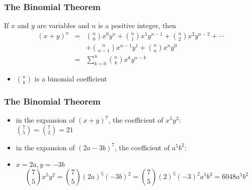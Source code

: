 \documentclass[dvipsnames]{beamer}
\begin{document}
\begin{frame}
  \frametitle{The Binomial Theorem}

  \begin{theorem}
    If $x$ and $y$ are variables and $n$ is a positive integer, then
    \begin{eqnarray*}
      (x+y)^n & = & {n\choose 0} x^0 y^n
                    + {n\choose 1} x^1 y^{n-1}
                    + {n\choose 2} x^2 y^{n-2} + \cdots\\
              &   & + {n\choose n-1} x^{n-1} y^1
                    + {n\choose n} x^n y^0 \\
              & = & \sum^n_{k=0}{{n\choose k} x^k y^{n-k}}
    \end{eqnarray*}
  \end{theorem}

  \pause
  \begin{itemize}
    \item ${n\choose k}$ is a \alert{binomial coefficient}
  \end{itemize}
\end{frame}

\begin{frame}
  \frametitle{The Binomial Theorem}

  \begin{example}
    \begin{itemize}
      \item in the expansion of $(x+y)^7$, the coefficient of $x^5 y^2$:\\
        ${7\choose 5} = {7 \choose 2} = 21$
    \end{itemize}
  \end{example}

  \pause
  \begin{example}
    \begin{itemize}
      \item in the expansion of $(2a-3b)^7$, the coefficient of $a^5 b^2$:
      \item $x=2a, y=-3b$
      \begin{equation*}
      {7\choose 5} x^5 y^2 = {7\choose 5} (2a)^5 (-3b)^2
                           = {7\choose 5} (2)^5 (-3)^2 a^5 b^2 = 6048 a^5 b^2
      \end{equation*}
    \end{itemize}
  \end{example}  
\end{frame}
\end{document}
